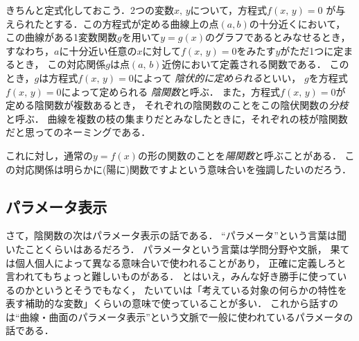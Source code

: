 きちんと定式化しておこう．2つの変数$x, \, y$について，方程式$f(x, \, y)=0$
が与えられたとする．この方程式が定める曲線上の点$(a, b)$の十分近くにおいて，
この曲線がある1変数関数$g$を用いて$y=g(x)$のグラフであるとみなせるとき，
すなわち，$a$に十分近い任意の$x$に対して$f(x, \, y)=0$をみたす$y$がただ1つに定まるとき，
この対応関係$g$は点$(a, \, b)$近傍において定義される関数である．
このとき，$g$は方程式$f(x, \, y)=0$によって
\emph{陰伏的に定められる}といい，
$g$を方程式$f(x, \, y)=0$によって定められる
\emph{陰関数}と呼ぶ．
また，方程式$f(x, \, y)=0$が定める陰関数が複数あるとき，
それぞれの陰関数のことをこの陰伏関数の\emph{分枝}と呼ぶ．
曲線を複数の枝の集まりだとみなしたときに，それぞれの枝が陰関数だと思ってのネーミングである．

これに対し，通常の$y=f(x)$の形の関数のことを\emph{陽関数}と呼ぶことがある．
この対応関係は明らかに(陽に)関数ですよという意味合いを強調したいのだろう．

\subsection{パラメータ表示}
さて，陰関数の次はパラメータ表示の話である．
``パラメータ''という言葉は聞いたことくらいはあるだろう．
パラメータという言葉は学問分野や文脈，
果ては個人個人によって異なる意味合いで使われることがあり，
正確に定義しろと言われてもちょっと難しいものがある．
とはいえ，みんな好き勝手に使っているのかというとそうでもなく，
たいていは「考えている対象の何らかの特性を表す補助的な変数」くらいの意味で使っていることが多い．
これから話すのは``曲線・曲面のパラメータ表示''という文脈で一般に使われているパラメータの話である．


